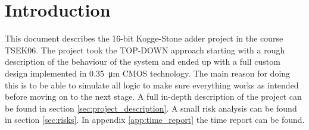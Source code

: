 \section{Introduction}
This document describes the 16-bit Kogge-Stone adder project in the course TSEK06. The project took the TOP-DOWN approach starting with a rough description of the behaviour of the system and ended up with a full custom design implemented in \SI{0.35}{\micro\m} CMOS technology. The main reason for doing this is to be able to simulate all logic to make sure everything works as intended before moving on to the next stage. A full in-depth description of the project can be found in section \ref{sec:project_description}. A small risk analysis can be found in section \ref{sec:risks}. In appendix \ref{app:time_report} the time report can be found.
